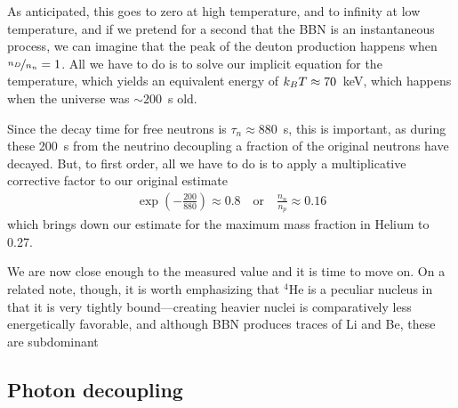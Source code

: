 As anticipated, this goes to zero at high temperature, and to infinity at low
temperature, and if we pretend for a second that the BBN is an instantaneous
process, we can imagine that the peak of the deuton production happens when
$\nicefrac{n_D}{n_n} = 1$. All we have to do is to solve our implicit equation
for the temperature, which yields an equivalent energy of $k_B T \approx 70$~keV,
which happens when the universe was $\sim 200$~s old.

Since the decay time for free neutrons is $\tau_n \approx 880$~s, this is important,
as during these 200~s from the neutrino decoupling a fraction of the original neutrons
have decayed. But, to first order, all we have to do is to apply a multiplicative
corrective factor to our original estimate
\begin{align*}
  \exp\left(-\frac{200}{880}\right) \approx 0.8 \quad\text{or}\quad
  \frac{n_n}{n_p} \approx 0.16
\end{align*}
which brings down our estimate for the maximum mass fraction in Helium to 0.27.

We are now close enough to the measured value and it is time to move on.
On a related note, though, it is worth emphasizing that $^4$He is a peculiar nucleus
in that it is very tightly bound---creating heavier nuclei is comparatively less
energetically favorable, and although BBN produces traces of Li and Be, these are
subdominant




\subsection{Photon decoupling}


